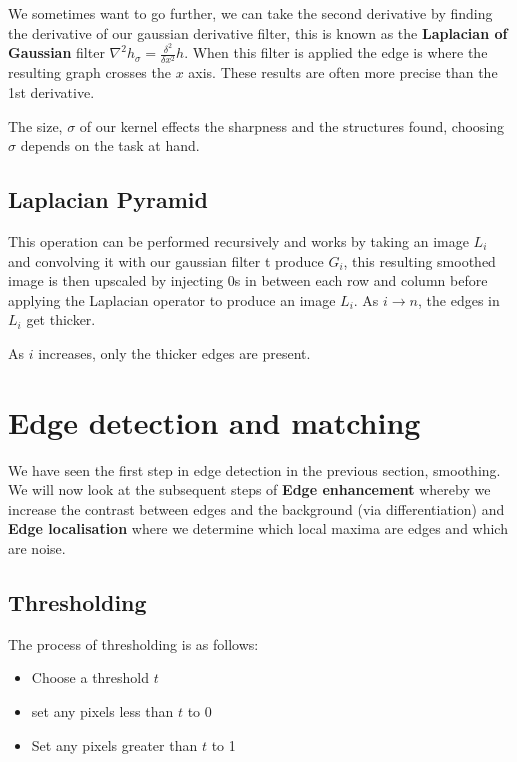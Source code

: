 \documentclass{article}
\begin{document}
We sometimes want to go further, we can take the second derivative by finding the derivative of our gaussian derivative filter, this is known as the \textbf{Laplacian of Gaussian} filter $ \nabla^{2} h_{\sigma} = \frac{\delta^{2}}{\delta x^{2}}h$. When this filter is applied the edge is where the resulting graph crosses the $x$ axis. These results are often more precise than the 1st derivative.

The size, $\sigma$ of our kernel effects the sharpness and the structures found, choosing \(\sigma\) depends on the task at hand.

\subsection{Laplacian Pyramid}

This operation can be performed recursively and works by taking an image $L_{i}$ and convolving it with our gaussian filter t produce $G_{i}$, this resulting smoothed image is then upscaled by injecting 0s in between each row and column before applying the Laplacian operator to produce an image $L_{i}$. As $i \rightarrow n$, the edges in $L_{i}$ get thicker.

As $i$ increases, only the thicker edges are present.


\section{Edge detection and matching}

We have seen the first step in edge detection in the previous section, smoothing. We will now look at the subsequent steps of \textbf{Edge enhancement} whereby we increase the contrast between edges and the background (via differentiation) and \textbf{Edge localisation} where we determine which local maxima are edges and which are noise.

\subsection{Thresholding}

The process of thresholding is as follows:

\begin{itemize}
  \item Choose a threshold $t$
  \item set any pixels less than $t$ to 0
  \item Set any pixels greater than $t$ to 1
\end{itemize}
\end{document}
